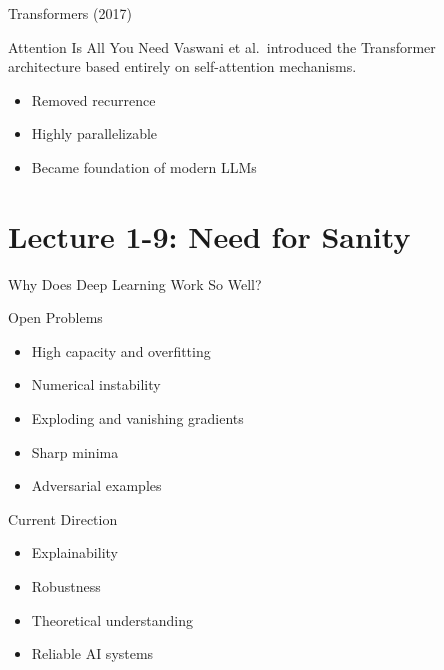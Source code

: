 \documentclass{beamer}
\begin{document}

\begin{frame}{Transformers (2017)}

\begin{block}{Attention Is All You Need}
Vaswani et al.\ introduced the Transformer architecture based entirely on self-attention mechanisms.
\end{block}

\vspace{0.2cm}

\begin{itemize}
\item Removed recurrence
\item Highly parallelizable
\item Became foundation of modern LLMs
\end{itemize}

\end{frame}

\section{Lecture 1-9: Need for Sanity}

\begin{frame}{Why Does Deep Learning Work So Well?}

\begin{alertblock}{Open Problems}
\begin{itemize}
\item High capacity and overfitting
\item Numerical instability
\item Exploding and vanishing gradients
\item Sharp minima
\item Adversarial examples
\end{itemize}
\end{alertblock}

\vspace{0.2cm}

\begin{block}{Current Direction}
\begin{itemize}
\item Explainability
\item Robustness
\item Theoretical understanding
\item Reliable AI systems
\end{itemize}
\end{block}

\end{frame}
\end{document}
